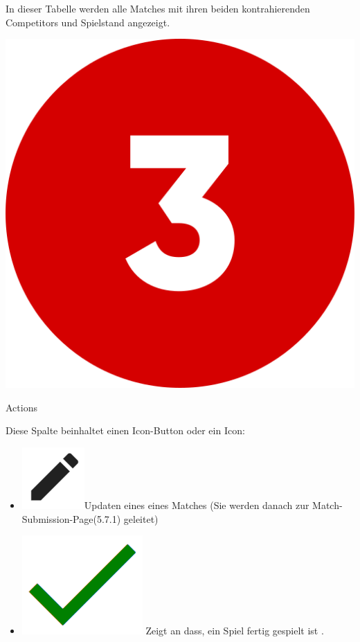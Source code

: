 In dieser Tabelle werden alle Matches mit ihren beiden kontrahierenden Competitors und Spielstand angezeigt.  

\bigskip
\includegraphics[scale=0.05]{pics/user-guide/numbers/number-3.png} \begin{LARGE} Actions \end{LARGE}

Diese Spalte beinhaltet einen Icon-Button oder ein Icon:
\begin{itemize}
    \item \includegraphics[scale=0.3]{pics/user-guide/edit-icon.PNG}Updaten eines eines Matches (Sie werden danach zur Match-Submission-Page(5.7.1) geleitet)
    \item \includegraphics[scale=0.2]{pics/user-guide/finished-icon.PNG} Zeigt an dass, ein Spiel fertig gespielt ist .
\end{itemize}

